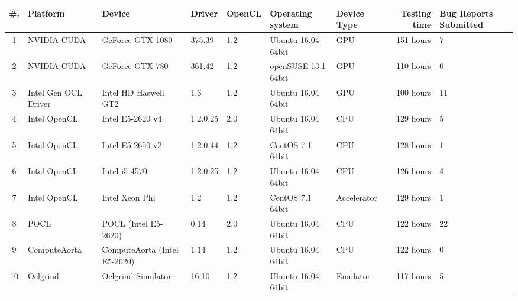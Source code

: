 \begin{tabular}{ cllllll | rR{1.4cm} }
\toprule
\textbf{\#. } & \textbf{Platform} & \textbf{Device} & \textbf{Driver} & \textbf{OpenCL} & 
\textbf{Operating system} & \textbf{Device Type} & \textbf{Testing time} & \textbf{Bug Reports Submitted} \\
 & NVIDIA CUDA & GeForce GTX 1080 & 375.39 & 1.2 & Ubuntu 16.04 64bit & GPU & 151 hours & 7 \\
2 & NVIDIA CUDA & GeForce GTX 780 & 361.42 & 1.2 & openSUSE  13.1 64bit & GPU & 110 hours & 0 \\
3 & Intel Gen OCL Driver & Intel HD Haswell GT2 & 1.3 & 1.2 & Ubuntu 16.04 64bit & GPU & 100 hours & 11 \\
4 & Intel OpenCL & Intel E5-2620 v4 & 1.2.0.25 & 2.0 & Ubuntu 16.04 64bit & CPU & 129 hours & 5 \\
5 & Intel OpenCL & Intel E5-2650 v2 & 1.2.0.44 & 1.2 & CentOS 7.1 64bit & CPU & 128 hours & 1 \\
6 & Intel OpenCL & Intel i5-4570 & 1.2.0.25 & 1.2 & Ubuntu 16.04 64bit & CPU & 126 hours & 4 \\
7 & Intel OpenCL & Intel Xeon Phi & 1.2 & 1.2 & CentOS 7.1 64bit & Accelerator & 129 hours & 1 \\
8 & POCL & POCL (Intel E5-2620) & 0.14 & 2.0 & Ubuntu 16.04 64bit & CPU & 122 hours & 22 \\
9 & ComputeAorta & ComputeAorta (Intel E5-2620) & 1.14 & 1.2 & Ubuntu 16.04 64bit & CPU & 122 hours & 0 \\
10 & Oclgrind & Oclgrind Simulator & 16.10 & 1.2 & Ubuntu 16.04 64bit & Emulator & 117 hours & 5 \\

\bottomrule
\end{tabular}

